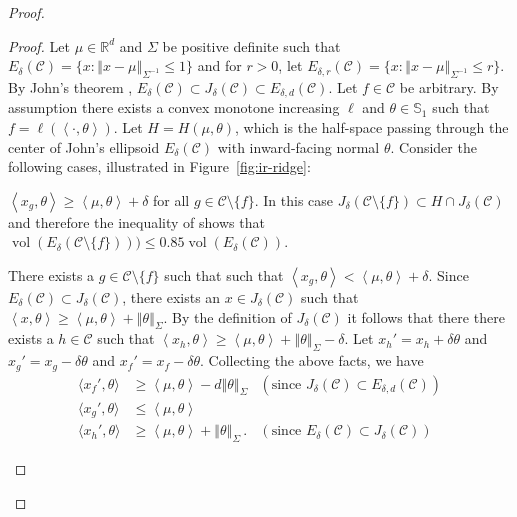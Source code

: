 \documentclass[letter, 12pt]{report}
\newcommand{\R}{\mathbb R}
\newcommand{\ip}[1]{\left \langle #1 \right \rangle}
\newcommand{\sip}[1]{\langle #1 \rangle}
\newcommand{\sphere}{\mathbb{S}}
\newcommand{\norm}[1]{\left \Vert  #1 \right \Vert}
\newcommand{\cC}{\mathcal C}
\newcommand{\vol}{\operatorname{vol}}
\newcommand{\1}{\mathbf{1}}
\theoremstyle{plain}
\theoremstyle{definition}
\theoremstyle{remark}
\begin{document}
\begin{proof}
    \begin{proof}
        Let $\mu \in \R^d$ and $\Sigma$ be positive definite such that $E_{\delta}(\cC) = \{x : \norm{x - \mu}_{\Sigma^{-1}} \leq 1 \}$ and for $r > 0$,
        let $E_{\delta,r}(\cC) = \{x : \norm{x - \mu}_{\Sigma^{-1}} \leq r\}$.
        By John's theorem \citep[Remark 2.1.17]{ASG15}, $E_{\delta}(\cC) \subset J_\delta(\cC) \subset E_{\delta,d}(\cC)$.
        Let $f \in \cC$ be arbitrary.
        By assumption there exists a convex monotone increasing $\ell$ and $\theta \in \sphere_1$ such that
        $f = \ell(\ip{\cdot, \theta})$.
        Let $H = H(\mu, \theta)$, which is the half-space passing through the center of John's ellipsoid $E_{\delta}(\cC)$ with inward-facing normal $\theta$.
        Consider the following cases, illustrated in Figure~\ref{fig:ir-ridge}:
        \begin{enumcases}
            \item \label{lem:ir-ridge:c1} $\ip{x_g, \theta} \geq \ip{\mu, \theta} + \delta$ for all $g \in \cC \setminus \{f\}$.
            In this case $J_\delta(\cC \setminus \{f\}) \subset H \cap J_\delta(\cC)$ and therefore
            the inequality of \cite{khachiyan1990inequality} shows that
            $\vol(E_{\delta}(\cC \setminus \{f\}))) \leq 0.85 \vol(E_{\delta}(\cC))$.
            \item \label{lem:ir-ridge:c2} There exists a $g \in \cC \setminus \{f\}$ such that
            such that $\ip{x_g, \theta} < \ip{\mu, \theta} + \delta$.
            Since $E_{\delta}(\cC) \subset J_\delta(\cC)$, there exists an $x \in J_\delta(\cC)$ such that
            $\ip{x, \theta} \geq \ip{\mu, \theta} + \norm{\theta}_\Sigma$.
            By the definition of $J_\delta(\cC)$ it follows that there there exists a $h \in \cC$ such that
            $\ip{x_h, \theta} \geq \ip{\mu, \theta} + \norm{\theta}_\Sigma - \delta$.
            Let $x_h' = x_h + \delta \theta$ and $x_g' = x_g - \delta \theta$ and $x_f' = x_f - \delta \theta$.
            Collecting the above facts, we have
            \begin{align}
                \sip{x_f', \theta} & \geq \ip{\mu, \theta} - d \norm{\theta}_\Sigma                           & (\text{since } J_\delta(\cC) \subset E_{\delta, d}(\cC)) \\
                \sip{x_g', \theta} & \leq \ip{\mu, \theta}                                                                                                               \\
                \sip{x_h', \theta} & \geq \ip{\mu, \theta} + \norm{\theta}_\Sigma \,. \label{eq:ts-ridge:rel} & (\text{since }  E_{\delta}(\cC) \subset J_\delta(\cC))

\end{align}
\end{enumcases}
\end{proof}
\end{proof}
\end{document}
